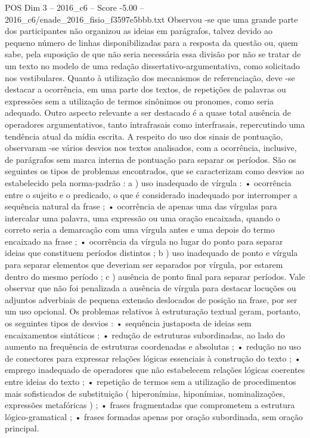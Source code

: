 \begin{textsample}{POS Dim 3 – 2016\_c6 – Score -5.00 – 2016\_c6/enade\_2016\_fisio\_f3597e5bbb.txt}
Observou -se que uma grande parte dos participantes não organizou as ideias em parágrafos, talvez devido ao pequeno número de linhas disponibilizadas para a resposta da questão ou, quem sabe, pela suposição de que não seria necessária essa divisão por não se tratar de um texto no modelo de uma redação dissertativo-argumentativa, como solicitado nos vestibulares.
Quanto à utilização dos mecanismos de referenciação, deve -se destacar a ocorrência, em uma parte dos textos, de repetições de palavras ou expressões sem a utilização de termos sinônimos ou pronomes, como seria adequado.
Outro aspecto relevante a ser destacado é a quase total ausência de operadores argumentativos, tanto intrafrasais como interfrasais, repercutindo uma tendência atual da mídia escrita.
A respeito do uso dos sinais de pontuação, observaram -se vários desvios nos textos analisados, com a ocorrência, inclusive, de parágrafos sem marca interna de pontuação para separar os períodos.
São os seguintes os tipos de problemas encontrados, que se caracterizam como desvios ao estabelecido pela norma-padrão : a ) uso inadequado de vírgula : • ocorrência entre o sujeito e o predicado, o que é considerado inadequado por interromper a sequência natural da frase ; • ocorrência de apenas uma das vírgulas para intercalar uma palavra, uma expressão ou uma oração encaixada, quando o correto seria a demarcação com uma vírgula antes e uma depois do termo encaixado na frase ; • ocorrência da vírgula no lugar do ponto para separar ideias que constituem períodos distintos ; b ) uso inadequado de ponto e vírgula para separar elementos que deveriam ser separados por vírgula, por estarem dentro do mesmo período ; c ) ausência de ponto final para separar períodos.
Vale observar que não foi penalizada a ausência de vírgula para destacar locuções ou adjuntos adverbiais de pequena extensão deslocados de posição na frase, por ser um uso opcional.
Os problemas relativos à estruturação textual geram, portanto, os seguintes tipos de desvios : • sequência justaposta de ideias sem encaixamentos sintáticos ; • redução de estruturas subordinadas, ao lado do aumento na frequência de estruturas coordenadas e absolutas ; • redução no uso de conectores para expressar relações lógicas essenciais à construção do texto ; • emprego inadequado de operadores que não estabelecem relações lógicas coerentes entre ideias do texto ; • repetição de termos sem a utilização de procedimentos mais sofisticados de substituição ( hiperonímias, hiponímias, nominalizações, expressões metafóricas ) ; • frases fragmentadas que comprometem a estrutura lógico-gramatical ; • frases formadas apenas por oração subordinada, sem oração principal.

\end{textsample}
